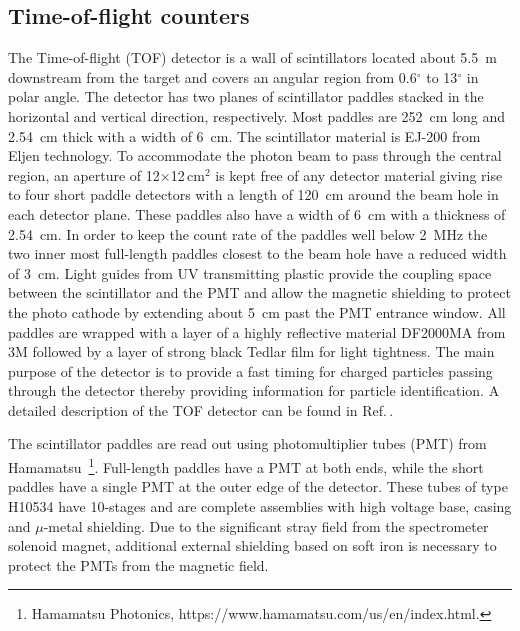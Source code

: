\subsection[Time-of-flight counters]{Time-of-flight counters \label{sec:tof}}
The Time-of-flight (TOF) detector is a wall of scintillators located about 5.5~m downstream from the target and covers 
an angular region from 0.6$^{\circ}$ to 13$^{\circ}$ in polar angle. The detector has two planes of
scintillator paddles stacked in the horizontal and vertical direction, respectively. Most paddles are 252~cm long and 2.54~cm
thick with a width of 6~cm. 
The scintillator material is EJ-200 from Eljen technology.
To accommodate the photon beam to pass through the central region,
an aperture of 12$\times$12\,cm$^2$ is kept
free of any detector material giving rise to four short paddle detectors with a length of 120~cm around the beam hole
in each detector plane. These paddles also have a width of 6~cm with a thickness of 2.54~cm. In order to keep the
count rate of the paddles well below 2~MHz the two inner most full-length paddles closest to the beam hole have a reduced width of 3~cm.
Light guides from UV transmitting plastic provide the coupling space between the scintillator and the PMT and allow the 
magnetic shielding to protect the photo cathode by extending about 5~cm past the PMT entrance window. All paddles are wrapped
with a layer of a highly reflective material DF2000MA from 3M followed by a layer of strong black Tedlar film for light tightness. 
The main purpose of the detector is to provide a fast timing for charged particles passing through the detector thereby providing information for particle identification. A detailed description of the TOF detector can be found in Ref.\,\cite{GlueXTOFNIM}. 

The scintillator paddles are read out using 
photomultiplier tubes (PMT) from Hamamatsu~\footnote{Hamamatsu Photonics, https://www.hamamatsu.com/us/en/index.html.}. Full-length paddles
have a PMT at both ends, while the short paddles have a single PMT
at the outer edge of the detector. These tubes of type H10534 have 10-stages and are complete assemblies with high voltage base, casing and $\mu$-metal shielding. Due to the significant stray field from the spectrometer solenoid magnet, additional external
shielding based on soft iron is necessary to protect the PMTs from the magnetic field.


